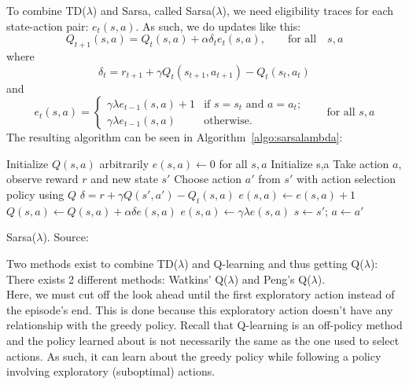 \documentclass[a4paper, 11pt]{article}
\begin{document}
To combine TD($\lambda$) and Sarsa, called Sarsa($\lambda$), we need eligibility traces for each state-action pair: $e_t(s,a)$. As such, we do updates like this:
\begin{equation}
Q_{t+1}(s,a) = Q_t(s,a) + \alpha \delta_t e_t(s,a), \qquad \text{for all} \quad s,a
\end{equation}
where
\begin{equation}
\delta_t = r_{t+1} + \gamma Q_t(s_{t+1},a_{t+1}) - Q_t(s_t,a_t)
\end{equation}
and
\begin{equation}
e_t(s,a) = \begin{cases}
	\gamma \lambda e_{t-1}(s,a) + 1 & \text{if $s=s_t$ and $a=a_t$;} \\
	\gamma \lambda e_{t-1}(s,a) & \text{otherwise}.
\end{cases}
\qquad \text{for all $s,a$}
\end{equation}
The resulting algorithm can be seen in Algorithm~\ref{algo:sarsalambda}:\\
\begin{algorithm}[htb]
\DontPrintSemicolon
Initialize $Q(s,a)$ arbitrarily\;
$e(s,a) \gets 0$ for all $s,a$\;
 {
	Initialize s,a\;
	 {
    	Take action $a$, observe reward $r$ and new state $s'$\;
        Choose action $a'$ from $s'$ with action selection policy using $Q$\;
        $\delta = r + \gamma Q(s',a') - Q_t(s,a)$\;
        $e(s,a) \gets e(s,a) + 1$\;
         {
        	$Q(s,a) \gets Q(s,a) + \alpha \delta e(s,a)$\;
            $e(s,a) \gets \gamma \lambda e(s,a)$\;
        }
        $s \gets s'$; $a \gets a'$\;
    }
}
\caption[Sarsa($\lambda$)]{Sarsa($\lambda$). Source: \cite{Sutton1998ReinforcementIntroduction}}
\label{algo:sarsalambda}
\end{algorithm}
Two methods exist to combine TD($\lambda$) and Q-learning and thus getting Q($\lambda$): There exists 2 different methods: Watkins' Q($\lambda$) and Peng's Q($\lambda$).\\
Here, we must cut off the look ahead until the first exploratory action instead of the episode's end. This is done because this exploratory action doesn't have any relationship with the greedy policy. Recall that Q-learning is an off-policy method and the policy learned about is not necessarily the same as the one used to select actions. As such, it can learn about the greedy policy while following a policy involving exploratory (suboptimal) actions.
\end{document}
